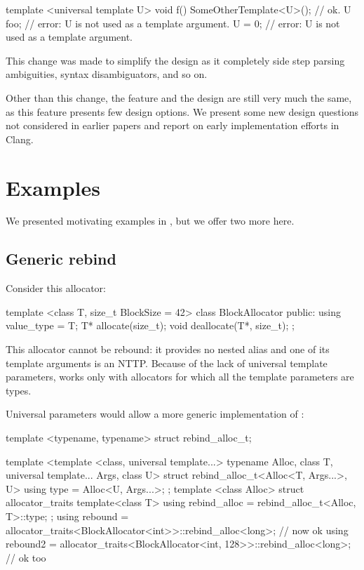 \documentclass{wg21}
\begin{document}
\begin{colorblock}
template <universal template U>
void f() {
  SomeOtherTemplate<U>(); // ok.
  U foo; // error: U is not used as a template argument.
  U = 0; // error: U is not used as a template argument.
}
\end{colorblock}

This change was made to simplify the design as it completely side step parsing ambiguities, syntax disambiguators, and so on.

Other than this change, the feature and the design are still very much the same, as this feature presents few design options.
We present some new design questions not considered in earlier papers and report on early implementation efforts in Clang.


\section{Examples}

We presented motivating examples in , but we offer two more here.

\subsection{Generic rebind}

Consider this allocator:

\begin{colorblock}
template <class T, size_t BlockSize = 42>
class BlockAllocator {
    public:
    using value_type = T;
    T* allocate(size_t);
    void deallocate(T*, size_t);
};
\end{colorblock}


This allocator cannot be rebound: it provides no  nested alias and one of its template arguments is an NTTP.
Because of the lack of universal template parameters,  works only with allocators for which all the template parameters are types.

Universal parameters would allow a more generic implementation of :


\begin{colorblock}
template <typename, typename>
struct rebind_alloc_t;

template <template <class, universal template...> typename Alloc, class T, universal template... Args, class U>
struct rebind_alloc_t<Alloc<T, Args...>, U> {
    using type = Alloc<U, Args...>;
};
template <class Alloc>
struct allocator_traits {
    template<class T>
    using rebind_alloc = rebind_alloc_t<Alloc, T>::type;
};
using rebound = allocator_traits<BlockAllocator<int>>::rebind_alloc<long>; // now ok
using rebound2 = allocator_traits<BlockAllocator<int, 128>>::rebind_alloc<long>; // ok too
\end{colorblock}
\end{document}
